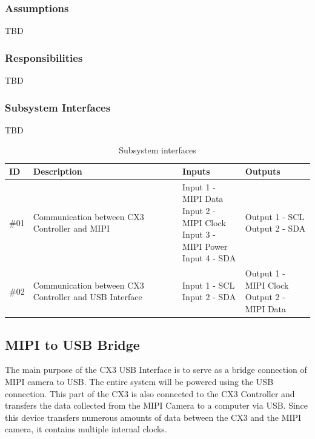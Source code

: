 \subsubsection{Assumptions}
TBD

\subsubsection{Responsibilities}
TBD

\subsubsection{Subsystem Interfaces}
TBD

\begin {table}[H]
\caption {Subsystem interfaces}
\begin{center}
    \begin{tabular}{ | p{1cm} | p{6cm} | p{3cm} | p{3cm} |}
    \hline
    ID & Description & Inputs & Outputs \\ \hline
    \#01 & Communication between CX3 Controller and MIPI & \pbox{3cm}{Input 1 - MIPI Data \\ Input 2 - MIPI Clock \\ Input 3 - MIPI Power \\ Input 4 - SDA} & \pbox{3cm}{Output 1 - SCL \\ Output 2 - SDA}  \\ \hline
    \#02 & Communication between CX3 Controller and USB Interface & \pbox{3cm}{Input 1 - SCL \\ Input 2 - SDA} & \pbox{3cm}{Output 1 - MIPI Clock \\ Output 2 - MIPI Data}  \\ \hline
    \end{tabular}
\end{center}
\end{table}

\subsection{MIPI to USB Bridge}
The main purpose of the CX3 USB Interface is to serve as a bridge connection of MIPI camera to USB. The entire system will be powered using the USB connection. This part of the CX3 is also connected to the CX3 Controller and transfers the data collected from the MIPI Camera to a computer via USB. Since this device transfers numerous amounts of data between the CX3 and the MIPI camera, it contains multiple internal clocks.

